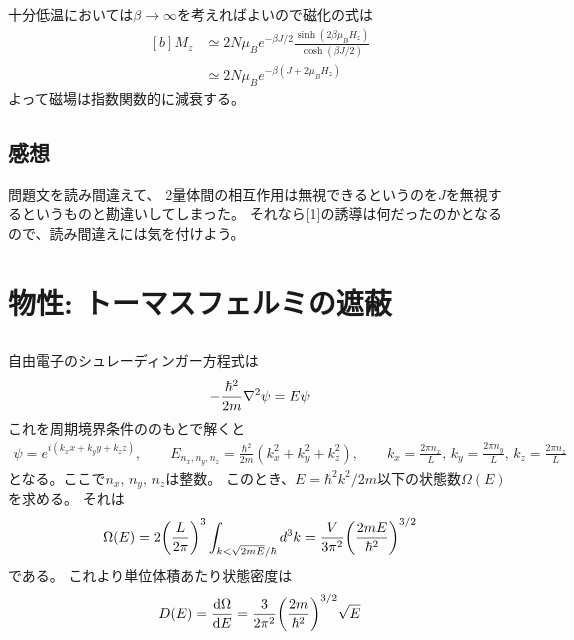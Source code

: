 \documentclass[../../master.tex]{subfiles}
\begin{document}
\section{}
十分低温においては\(\beta \to \infty\)を考えればよいので磁化の式は
\begin{equation}\begin{aligned}[b]
    M_z &\simeq 2N\mu_B e^{-\beta J/2}\frac{\sinh(2\beta\mu_BH_z)}{\cosh(\beta J/2)}\\
    &\simeq 2N\mu_B e^{-\beta (J+2\mu_B H_z)}
\end{aligned}\end{equation}
よって磁場は指数関数的に減衰する。

\section*{感想}
問題文を読み間違えて、
2量体間の相互作用は無視できるというのを\(J\)を無視するというものと勘違いしてしまった。
それなら[1]の誘導は何だったのかとなるので、読み間違えには気を付けよう。


\chapter{物性: トーマスフェルミの遮蔽}
\section{}
\subsection{}
自由電子のシュレーディンガー方程式は
\begin{align}
    -\frac{\hbar^2}{2m}\laplacian \psi = E\psi
\end{align}
これを周期境界条件ののもとで解くと
\begin{align}
    \psi = e^{i(k_x x+k_y y+k_z z)},\qquad
    E_{n_x,n_y,n_z} = \frac{\hbar^2}{2m}(k_x^2+k_y^2+k_z^2),\qquad
    k_x = \frac{2\pi n_x}{L},\,k_y = \frac{2\pi n_y}{L},\,k_z = \frac{2\pi n_z}{L}
\end{align}
となる。ここで\(n_x,\,n_y,\,n_z\)は整数。
このとき、\(E=\hbar^2k^2/2m\)以下の状態数\(\Omega(E)\)を求める。
それは
\begin{align}
    \Omega(E) = 2\qty(\frac{L}{2\pi})^3\int_{k<\sqrt{2mE}/\hbar}d^3k
    = \frac{V}{3\pi^2}\qty(\frac{2mE}{\hbar^2})^{3/2}
\end{align}
である。
これより単位体積あたり状態密度は
\begin{align}
    D(E) = \dv{\Omega}{E} = \frac{3}{2\pi^2}\qty(\frac{2m}{\hbar^2})^{3/2}\sqrt{E}
\end{align}
\end{document}
